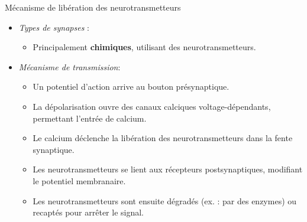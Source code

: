 \documentclass[10pt,french]{beamer}
\begin{document}
\begin{frame}{Mécanisme de libération des neurotransmetteurs}
	\begin{itemize}
		\item [$\diamond$]\textit{Types de synapses} :
		\begin{itemize} 
			\item[-] Principalement \textbf{chimiques}, utilisant des neurotransmetteurs.
		\end{itemize}
		\item [$\diamond$] \textit{Mécanisme de transmission}:
		\begin{itemize}
			\item[-] Un potentiel d’action arrive au bouton présynaptique.
			\item[-] La dépolarisation ouvre des canaux calciques voltage-dépendants, permettant l’entrée de calcium.
			\item[-] Le calcium déclenche la libération des neurotransmetteurs dans la fente synaptique.
			\item[-] Les neurotransmetteurs se lient aux récepteurs postsynaptiques, modifiant le potentiel membranaire.
			\item[-] Les neurotransmetteurs sont ensuite dégradés (ex. : par des enzymes) ou recaptés pour arrêter le signal.
		\end{itemize}
	\end{itemize}
\end{frame}
	
\end{document}
